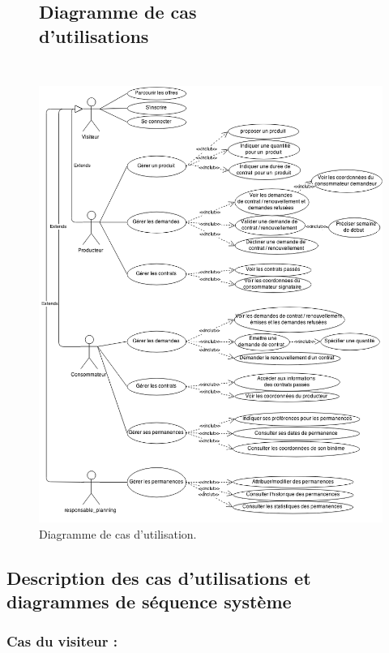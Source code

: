 \documentclass[12pt]{report}
\begin{document}
\begin{figure}[!h]
\centering
\subsection{Diagramme de cas d'utilisations~~~~~~~~~~~~~~~~~~~~~~~~~~~~~~~}
\includegraphics[height=1.35\textwidth]{./ressources/use_case.png}
\caption{Diagramme de cas d'utilisation.}
\end{figure}
\clearpage

\subsection{Description des cas d'utilisations et diagrammes de séquence système}

\subsubsection{Cas du visiteur :}
\end{document}
